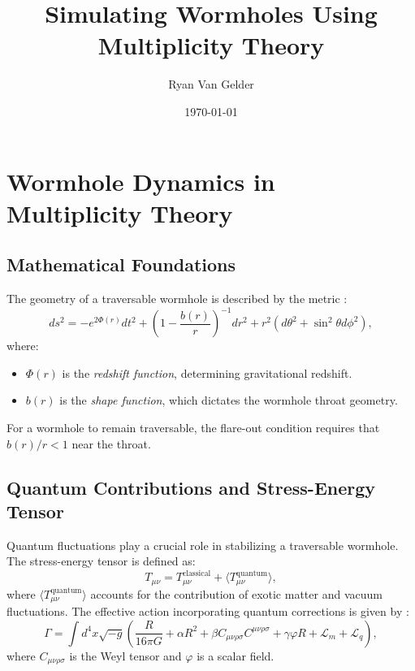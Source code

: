 \documentclass{article}
\theoremstyle{plain}
\begin{document}
\title{Simulating Wormholes Using Multiplicity Theory}

\author{Ryan Van Gelder}
\date{\today}

\maketitle

\section{Wormhole Dynamics in Multiplicity Theory}

\subsection{Mathematical Foundations}

The geometry of a traversable wormhole is described by the metric \cite{morris1988wormholes}:
\begin{equation}
ds^2 = -e^{2\Phi(r)} dt^2 + \left(1 - \frac{b(r)}{r} \right)^{-1} dr^2 + r^2(d\theta^2 + \sin^2\theta d\phi^2),
\end{equation}
where:
\begin{itemize}
    \item $\Phi(r)$ is the \textit{redshift function}, determining gravitational redshift.
    \item $b(r)$ is the \textit{shape function}, which dictates the wormhole throat geometry.
\end{itemize}

For a wormhole to remain traversable, the flare-out condition requires that $b(r)/r < 1$ near the throat.

\subsection{Quantum Contributions and Stress-Energy Tensor}

Quantum fluctuations play a crucial role in stabilizing a traversable wormhole. The stress-energy tensor is defined as:
\begin{equation}
T_{\mu\nu} = T_{\mu\nu}^{\text{classical}} + \langle T_{\mu\nu}^{\text{quantum}} \rangle,
\end{equation}
where $\langle T_{\mu\nu}^{\text{quantum}} \rangle$ accounts for the contribution of exotic matter and vacuum fluctuations. The effective action incorporating quantum corrections is given by \cite{hawking1975radiation}:
\begin{equation}
\Gamma = \int d^4x \sqrt{-g} \left( \frac{R}{16\pi G} + \alpha R^2 + \beta C_{\mu\nu\rho\sigma} C^{\mu\nu\rho\sigma} + \gamma \varphi R + \mathcal{L}_m + \mathcal{L}_q \right),
\end{equation}
where $C_{\mu\nu\rho\sigma}$ is the Weyl tensor and $\varphi$ is a scalar field.
\end{document}
